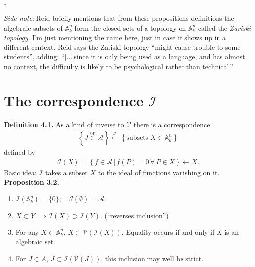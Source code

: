 \documentclass[12pt]{article}
\newcommand{\lc}{\left\{}
\newcommand{\rc}{\right\}}
\begin{document}
\hfill $\square$





\textit{Side note}: Reid briefly mentions that from these propositions-definitions the algebraic subsets of $\mathbb{A}^n_k$ form the closed sets of a topology on $\mathbb{A}^n_k$ called the \textit{Zariski topology}. I'm just mentioning the name here, just in case it shows up in a different context. Reid says the Zariski topology ``might cause trouble to some students'', adding:  ``[...]since it is only being used as a language, and has almost no context, the difficulty is likely to be psychological rather than technical.''










\newpage


\section{The correspondence $\mathcal{I}$}


\textbf{Definition 4.1.} As a kind of inverse to $\mathcal{V}$ there is a correspondence 
\begin{align*}
\lc J \overset{\text{idl}}{\subset} \mathcal{A} \rc \xleftarrow{\mathcal{I}} \lc \text{subsets } X \in \mathbb{A}^n_k \rc
\end{align*}
defined by
\begin{align*}
\mathcal{I}(X) = \lc f \in \mathcal{A} \,\vert\, f(P) = 0\,\forall\, P \in X \rc \leftarrow X.
\end{align*}
\underline{Basic idea}: $\mathcal{I}$ takes a subset $X$ to the ideal of functions vanishing on it. \\

\noindent \textbf{Proposition 3.2.} 
\begin{enumerate}
	\item $\mathcal{I}(\mathbb{A}^n_k) = \{0\}; \quad \mathcal{I}(\emptyset) = \mathcal{A}$. 
	\item $X \subset Y \implies \mathcal{I}(X) \supset \mathcal{I}(Y)$. (``reverses inclusion'')
	\item For any $X \subset \mathbb{A}^n_k$, $X \subset \mathcal{V}(\mathcal{I}(X))$. Equality occurs if and only if $X$ is an algebraic set.
	\item For $J \subset A$, $J \subset \mathcal{I}(\mathcal{V}(J))$, this inclusion may well be strict.   
\end{enumerate} 
\end{document}
